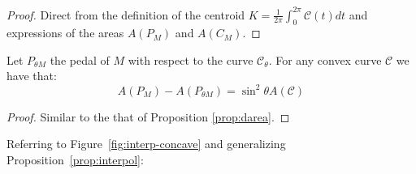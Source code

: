 \begin{proof} Direct from the definition of the centroid  $K=\frac{1}{2\pi}\int_0^{2\pi}\mathcal{C}(t)dt$ and expressions of the areas $A(P_M)$ and $A(C_M)$.
\end{proof}

\begin{proposition} Let $P_{ {\theta }M}$ the pedal of $M$ with respect to the curve $\mathcal{C}_\theta$.  For any convex curve $\mathcal{C}$ we have that:
	\[A(P_M)-A(P_{ {\theta }M})=\sin^2\theta A(\mathcal{C})\]
	
	\end{proposition}

\begin{proof} Similar to the that of Proposition \ref{prop:darea}.
\end{proof}

Referring to Figure~\ref{fig:interp-concave} and generalizing Proposition~\ref{prop:interpol}:

	
	

	

	

